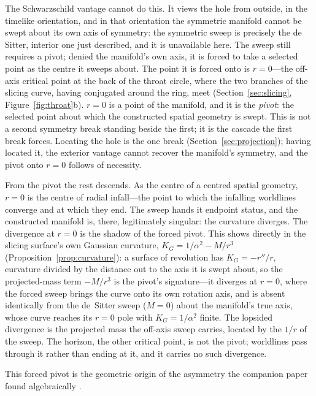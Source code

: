 \documentclass[11pt,a4paper]{article}
\theoremstyle{definition}
\begin{document}
The Schwarzschild vantage cannot do this. It views the hole from outside, in the timelike orientation, and in that orientation the symmetric manifold cannot be swept about its own axis of symmetry: the symmetric sweep is precisely the de Sitter, interior one just described, and it is unavailable here. The sweep still requires a pivot; denied the manifold's own axis, it is forced to take a selected point as the centre it sweeps about. The point it is forced onto is $r=0$---the off-axis critical point at the back of the throat circle, where the two branches of the slicing curve, having conjugated around the ring, meet (Section~\ref{sec:slicing}, Figure~\ref{fig:throat}b). $r=0$ is a point of the manifold, and it is the \emph{pivot}: the selected point about which the constructed spatial geometry is swept. This is not a second symmetry break standing beside the first; it is the cascade the first break forces. Locating the hole is the one break (Section~\ref{sec:projection}); having located it, the exterior vantage cannot recover the manifold's symmetry, and the pivot onto $r=0$ follows of necessity.

From the pivot the rest descends. As the centre of a centred spatial geometry, $r=0$ is the centre of radial infall---the point to which the infalling worldlines converge and at which they end. The sweep hands it endpoint status, and the constructed manifold is, there, legitimately singular: the curvature diverges. The divergence at $r=0$ is the shadow of the forced pivot. This shows directly in the slicing surface's own Gaussian curvature, $K_{G}=1/\alpha^{2}-M/r^{3}$ (Proposition~\ref{prop:curvature}): a surface of revolution has $K_{G}=-r''/r$, curvature divided by the distance out to the axis it is swept about, so the projected-mass term $-M/r^{3}$ is the pivot's signature---it diverges at $r=0$, where the forced sweep brings the curve onto its own rotation axis, and is absent identically from the de~Sitter sweep ($M=0$) about the manifold's true axis, whose curve reaches its $r=0$ pole with $K_{G}=1/\alpha^{2}$ finite. The lopsided divergence is the projected mass the off-axis sweep carries, located by the $1/r$ of the sweep. The horizon, the other critical point, is not the pivot; worldlines pass through it rather than ending at it, and it carries no such divergence.

This forced pivot is the geometric origin of the asymmetry the companion paper found algebraically
\cite{JanzenCircle}.
\end{document}
